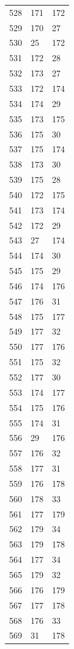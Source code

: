 \documentclass[a4paper,11pt]{article}
\begin{document}
\begin{center}
\begin{longtable}{|R{1.5cm}|R{1.5cm}|R{1.5cm}|}
  528 &  171 &  172 \\
  529 &  170 &   27 \\
  530 &   25 &  172 \\
  531 &  172 &   28 \\
  532 &  173 &   27 \\
  533 &  172 &  174 \\
  534 &  174 &   29 \\
  535 &  173 &  175 \\
  536 &  175 &   30 \\
  537 &  175 &  174 \\
  538 &  173 &   30 \\
  539 &  175 &   28 \\
  540 &  172 &  175 \\
  541 &  173 &  174 \\
  542 &  172 &   29 \\
  543 &   27 &  174 \\
  544 &  174 &   30 \\
  545 &  175 &   29 \\
  546 &  174 &  176 \\
  547 &  176 &   31 \\
  548 &  175 &  177 \\
  549 &  177 &   32 \\
  550 &  177 &  176 \\
  551 &  175 &   32 \\
  552 &  177 &   30 \\
  553 &  174 &  177 \\
  554 &  175 &  176 \\
  555 &  174 &   31 \\
  556 &   29 &  176 \\
  557 &  176 &   32 \\
  558 &  177 &   31 \\
  559 &  176 &  178 \\
  560 &  178 &   33 \\
  561 &  177 &  179 \\
  562 &  179 &   34 \\
  563 &  179 &  178 \\
  564 &  177 &   34 \\
  565 &  179 &   32 \\
  566 &  176 &  179 \\
  567 &  177 &  178 \\
  568 &  176 &   33 \\
  569 &   31 &  178 \\

\end{longtable}
\end{center}
\end{document}
